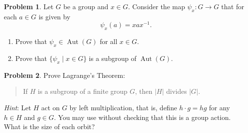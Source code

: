 \documentclass[11pt]{article}
\DeclareMathOperator{\Aut}{Aut}
\theoremstyle{definition}
\newtheorem{problem}{Problem}
\begin{document}
\begin{problem}
Let $G$ be a group and $x\in G$. Consider the map $\psi_x\!:G\to G$ that for each $a \in G$ is given by 
$$\psi_x(a)=xax^{-1}.$$
\begin{enumerate}[label=(\alph*)]
\item Prove that $\psi_x\in \Aut(G)$ for all $x\in G$. 

\item Prove that $\{\psi_x\mid x\in G\}$ is a subgroup of $\operatorname{Aut}(G)$.

\end{enumerate}
\end{problem}






\begin{problem}
Prove Lagrange's Theorem: 
\begin{quote}
If $H$ is a subgroup of a finite group $G$, then $|H|$ divides $|G|$. 
\end{quote}

\noindent
{\em Hint}: Let $H$ act on $G$ by left multiplication, that is, define $h \cdot g= hg$ for any $h\in H$ and $g\in G$. You may use without checking that this is a group action. What is the size of each orbit?
\end{problem}
\end{document}
